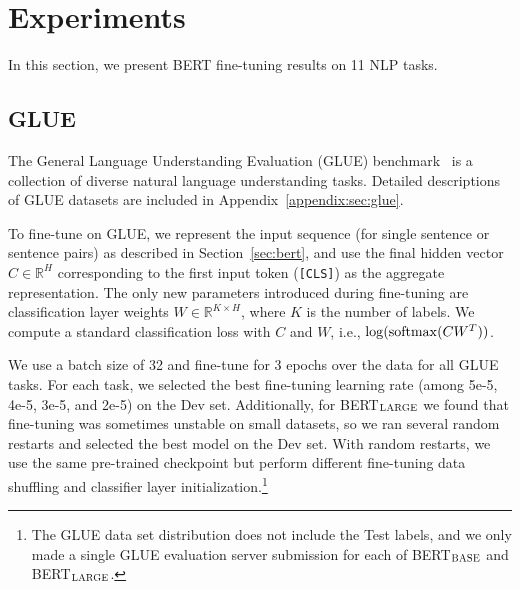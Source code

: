 \documentclass[11pt,a4paper]{article}
\newcommand\bertbase{BERT$_{\small \textsc{BASE}}$\xspace}
\newcommand\bertlarge{BERT$_{\small \textsc{LARGE}}$\xspace}
\begin{document}
\section{Experiments}
\label{sec:experiments}

In this section, we present BERT fine-tuning results on 11 NLP tasks. 

\subsection{GLUE}
\label{sec:glue}

The General Language Understanding Evaluation (GLUE) benchmark~\cite{wang-etal:2018:_glue} is a collection of diverse natural language understanding tasks.
Detailed descriptions of GLUE datasets are included in Appendix~\ref{appendix:sec:glue}.

To fine-tune on GLUE, we represent the input sequence (for single sentence or sentence pairs) as described in Section~\ref{sec:bert}, and use the final hidden vector $C \in \mathbb{R}^{H}$ corresponding to the first input token ({\tt [CLS]}) as the aggregate representation.
The only new parameters introduced during fine-tuning are  classification layer weights $W \in \mathbb{R}^{K \times H}$, where $K$ is the number of labels. We compute a standard classification loss with $C$ and $W$, i.e., $\log({\rm softmax}(CW^T))$.

We use a batch size of 32 and fine-tune for 3 epochs over the data for all GLUE tasks. For each task, we selected the best fine-tuning learning rate (among 5e-5, 4e-5, 3e-5, and 2e-5) on the Dev set. Additionally, for \bertlarge we found that fine-tuning was sometimes unstable on small datasets, so we ran several random restarts and selected the best model on the Dev set. With random restarts, we use the same pre-trained checkpoint but perform different fine-tuning data shuffling and classifier layer initialization.\footnote{The GLUE data set distribution does not include the Test labels, and we only made a single GLUE evaluation server submission for each of \bertbase and \bertlarge.}
\end{document}
